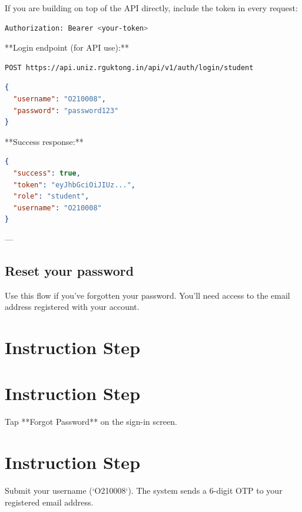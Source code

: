 If you are building on top of the API directly, include the token in every request:

\begin{lstlisting}[language=bash]
Authorization: Bearer <your-token>

\end{lstlisting}

**Login endpoint (for API use):**

\begin{lstlisting}[language=bash]
POST https://api.uniz.rguktong.in/api/v1/auth/login/student

\end{lstlisting}

\begin{lstlisting}[language=json]
{
  "username": "O210008",
  "password": "password123"
}

\end{lstlisting}

**Success response:**

\begin{lstlisting}[language=json]
{
  "success": true,
  "token": "eyJhbGciOiJIUz...",
  "role": "student",
  "username": "O210008"
}

\end{lstlisting}

---

\subsection{Reset your password}

Use this flow if you've forgotten your password. You'll need access to the email address registered with your account.


\section{Instruction Step}

  
\section{Instruction Step}

    Tap **Forgot Password** on the sign-in screen.
  
  
\section{Instruction Step}

    Submit your username (`O210008`). The system sends a 6-digit OTP to your registered email address.

